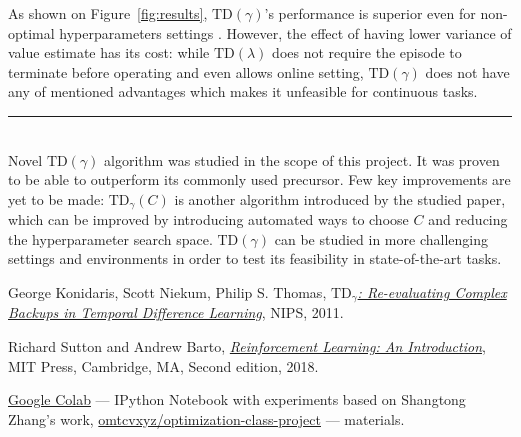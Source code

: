 \documentclass[a0]{a0poster}
\def\Head#1{\noindent{\LARGE\color{bluegray} #1}\bigskip}
\begin{document}
\begin{textblock}{7.0}
As shown on Figure~\ref{fig:results}, $\text{TD}(\gamma)$'s performance is
superior even for non-optimal hyperparameters settings . However, the effect of
having lower variance of value estimate has its cost: while
$\text{TD}(\lambda)$ does not require the episode to terminate before operating
and even allows online setting, $\text{TD}(\gamma)$ does not have any of
mentioned advantages which makes it unfeasible for continuous tasks.

\medskip
\hrule\medskip
\Head{Conclusion \& Future Work}\\

Novel $\text{TD}(\gamma)$ algorithm was studied in the scope of this project.
It was proven to be able to outperform its commonly used precursor. Few key
improvements are yet to be made: $\text{TD}_{\gamma}(C)$ is another algorithm
introduced by the studied paper, which can be improved by introducing automated
ways to choose $C$ and reducing the hyperparameter search space.
$\text{TD}(\gamma)$ can be studied in more challenging settings and
environments in order to test its feasibility in state-of-the-art tasks.

\begin{thebibliography}{9}

  George Konidaris, Scott Niekum, Philip S. Thomas,
  \href{https://papers.nips.cc/paper/4472-td_gamma-re-evaluating-complex-backups-in-temporal-difference-learning.pdf}{\color{blue}
  \textit{$\text{TD}_{\gamma}$: Re-evaluating Complex Backups in Temporal
          Difference Learning}},
  NIPS,
  2011.

  Richard Sutton and Andrew Barto,
  \href{http://incompleteideas.net/book/the-book-2nd.html}{\color{blue}\textit{Reinforcement Learning: An Introduction}},
  MIT Press, Cambridge, MA,
  Second edition,
  2018.

  \href{https://drive.google.com/file/d/1fmRALZn0-BRKlHWK\_juP9sswUdpEtCZ0/view?usp=sharing}{\color{blue}Google Colab} ---
  IPython Notebook with experiments based on Shangtong Zhang's work,
  \href{https://github.com/omtcvxyz/optimization-class-project}{\color{blue}omtcvxyz/optimization-class-project} --- materials.

\end{thebibliography}

\end{textblock}
\end{document}
